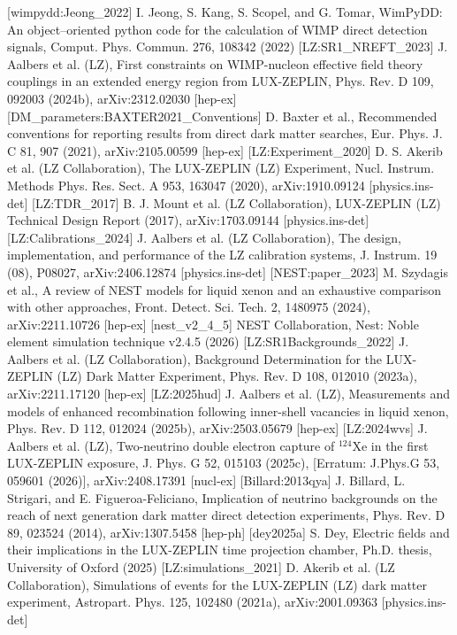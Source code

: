 [wimpydd:Jeong_2022] I. Jeong, S. Kang, S. Scopel, and G. Tomar, WimPyDD: An object–oriented python code for the calculation of WIMP direct detection signals, Comput. Phys. Commun. 276, 108342 (2022)
[LZ:SR1_NREFT_2023] J. Aalbers et al. (LZ), First constraints on WIMP-nucleon effective field theory couplings in an extended energy region from LUX-ZEPLIN, Phys. Rev. D 109, 092003 (2024b), arXiv:2312.02030 [hep-ex]
[DM_parameters:BAXTER2021_Conventions] D. Baxter et al., Recommended conventions for reporting results from direct dark matter searches, Eur. Phys. J. C 81, 907 (2021), arXiv:2105.00599 [hep-ex]
[LZ:Experiment_2020] D. S. Akerib et al. (LZ Collaboration), The LUX-ZEPLIN (LZ) Experiment, Nucl. Instrum. Methods Phys. Res. Sect. A 953, 163047 (2020), arXiv:1910.09124 [physics.ins-det]
[LZ:TDR_2017] B. J. Mount et al. (LZ Collaboration), LUX-ZEPLIN (LZ) Technical Design Report (2017), arXiv:1703.09144 [physics.ins-det]
[LZ:Calibrations_2024] J. Aalbers et al. (LZ Collaboration), The design, implementation, and performance of the LZ calibration systems, J. Instrum. 19 (08), P08027, arXiv:2406.12874 [physics.ins-det]
[NEST:paper_2023] M. Szydagis et al., A review of NEST models for liquid xenon and an exhaustive comparison with other approaches, Front. Detect. Sci. Tech. 2, 1480975 (2024), arXiv:2211.10726 [hep-ex]
[nest_v2_4_5] NEST Collaboration, Nest: Noble element simulation technique v2.4.5 (2026)
[LZ:SR1Backgrounds_2022] J. Aalbers et al. (LZ Collaboration), Background Determination for the LUX-ZEPLIN (LZ) Dark Matter Experiment, Phys. Rev. D 108, 012010 (2023a), arXiv:2211.17120 [hep-ex]
[LZ:2025hud] J. Aalbers et al. (LZ), Measurements and models of enhanced recombination following inner-shell vacancies in liquid xenon, Phys. Rev. D 112, 012024 (2025b), arXiv:2503.05679 [hep-ex]
[LZ:2024wvs] J. Aalbers et al. (LZ), Two-neutrino double electron capture of $^124$Xe in the first LUX-ZEPLIN exposure, J. Phys. G 52, 015103 (2025c), [Erratum: J.Phys.G 53, 059601 (2026)], arXiv:2408.17391 [nucl-ex]
[Billard:2013qya] J. Billard, L. Strigari, and E. Figueroa-Feliciano, Implication of neutrino backgrounds on the reach of next generation dark matter direct detection experiments, Phys. Rev. D 89, 023524 (2014), arXiv:1307.5458 [hep-ph]
[dey2025a] S. Dey, Electric fields and their implications in the LUX-ZEPLIN time projection chamber, Ph.D. thesis, University of Oxford (2025)
[LZ:simulations_2021] D. Akerib et al. (LZ Collaboration), Simulations of events for the LUX-ZEPLIN (LZ) dark matter experiment, Astropart. Phys. 125, 102480 (2021a), arXiv:2001.09363 [physics.ins-det]
